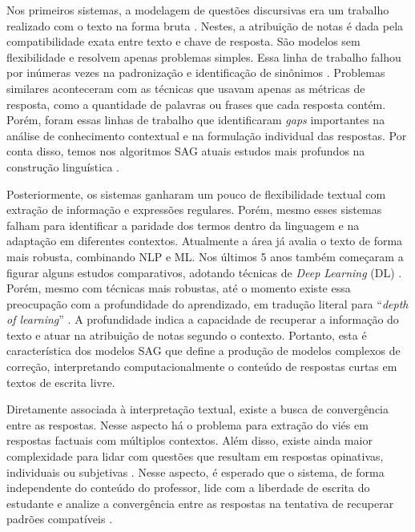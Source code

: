 Nos primeiros sistemas, a modelagem de questões discursivas era um trabalho realizado com o texto na forma bruta \cite{perez-marin2009}. Nestes, a atribuição de notas é dada pela compatibilidade exata entre texto e chave de resposta. São modelos sem flexibilidade e resolvem apenas problemas simples. Essa linha de trabalho falhou por inúmeras vezes na padronização e identificação de sinônimos \cite{leffa2003}. Problemas similares aconteceram com as técnicas que usavam apenas as métricas de resposta, como a quantidade de palavras ou frases que cada resposta contém. Porém, foram essas linhas de trabalho que identificaram \textit{gaps} importantes na análise de conhecimento contextual e na formulação individual das respostas. Por conta disso, temos nos algoritmos SAG atuais estudos mais profundos na construção linguística \cite{filighera2020}.

Posteriormente, os sistemas ganharam um pouco de flexibilidade textual com extração de informação e expressões regulares. Porém, mesmo esses sistemas falham para identificar a paridade dos termos dentro da linguagem e na adaptação em diferentes contextos. Atualmente a área já avalia o texto de forma mais robusta, combinando NLP e ML. Nos últimos 5 anos também começaram a figurar alguns estudos comparativos, adotando técnicas de \textit{Deep Learning} (DL) \cite{bonthu2021}. Porém, mesmo com técnicas mais robustas, até o momento existe essa preocupação com a profundidade do aprendizado, em tradução literal para ``\textit{depth of learning}'' \cite{burrows2015}. A profundidade indica a capacidade de recuperar a informação do texto e atuar na atribuição de notas segundo o contexto. Portanto, esta é característica dos modelos SAG que define a produção de modelos complexos de correção, interpretando computacionalmente o conteúdo de respostas curtas em textos de escrita livre.

Diretamente associada à interpretação textual, existe a busca de convergência entre as respostas. Nesse aspecto há o problema para extração do viés em respostas factuais com múltiplos contextos. Além disso, existe ainda maior complexidade para lidar com questões que resultam em respostas opinativas, individuais ou subjetivas \cite{bailey2008}. Nesse aspecto, é esperado que o sistema, de forma independente do conteúdo do professor, lide com a liberdade de escrita do estudante e analize a convergência entre as respostas na tentativa de recuperar padrões compatíveis \cite{saha2018, lui2022}.

